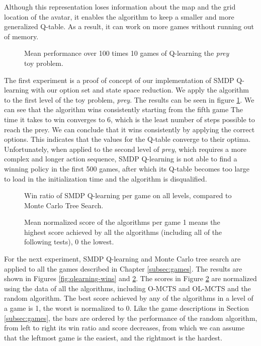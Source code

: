 Although this representation loses information about the map and the grid
location of the avatar, it enables the algorithm to keep a smaller and more
generalized Q-table. As a result, it can work on more games without running out
of
memory.

\begin{figure}
	\centering
	\caption{Mean performance over 100 times 10 games of Q-learning the
	\textit{prey} toy problem.}
	\label{fig:qlearning}
\end{figure}

The first experiment is a proof of concept of our implementation of SMDP
Q-learning with our option set and state space reduction. We apply the algorithm to the
first level of the toy problem, \textit{prey}. The results can be seen in figure
\ref{fig:qlearning}. We can see that the algorithm wins consistently starting
from the fifth game The time it takes to win converges to 6, which is
the least number of steps possible to reach the prey. We can conclude that it
wins consistently by applying the correct options. This indicates that the
values for the Q-table converge to their optima. Unfortunately, when applied to
the second level of \textit{prey}, which requires a more complex and longer
action sequence, SMDP Q-learning is not able to find a winning policy in the
first 500 games, after which its Q-table becomes too large to load in the
initialization time and the algorithm is disqualified.

\begin{figure}
	\centering
	\vspace{-.8cm}
	\caption{Win ratio of SMDP Q-learning per game on all levels, compared to Monte Carlo Tree Search.}
	\label{fig:qlearning-wins}
	\centering
	\vspace{-.8cm}
	\caption{Mean normalized score of the algorithms per game 1 means the
	highest score achieved by all the algorithms (including all of the following
tests), 0 the lowest.}
	\label{fig:qlearning-scores}
\end{figure}

For the next experiment, SMDP Q-learning and Monte Carlo tree search are applied
to all the games described in Chapter \ref{subsec:games}. The results are shown
in Figures \ref{fig:qlearning-wins} and \ref{fig:qlearning-scores}. The scores
in Figure \ref{fig:qlearning-scores} are normalized using the data of all the
algorithms, including O-MCTS and OL-MCTS and the random algorithm. The best
score achieved by any of the algorithms in a level of a game is 1, the worst is
normalized to 0. Like the game descriptions in Section \ref{subsec:games}, the
bars are ordered by the performance of the random algorithm, from left to right
its win ratio and score decreases, from which we can assume that the leftmost
game is the easiest, and the rightmost is the hardest.

